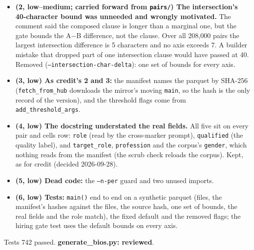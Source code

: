 \documentclass{article}
\begin{document}
\begin{itemize}
        drop. The cost is three times as many real biographies processed and stored.
  \item \textbf{(2, low--medium; carried forward from \texttt{pairs/}) The intersection's 40-character bound was
        unneeded and wrongly motivated.} The comment said the composed clause is longer than a marginal one, but the
        gate bounds the A$-$B difference, not the clause. Over all 208{,}000 pairs the largest intersection
        difference is 5 characters and no axis exceeds 7. A builder mistake that dropped part of one intersection
        clause would have passed at 40. Removed (\texttt{--intersection-char-delta}): one set of bounds for every axis.
  \item \textbf{(3, low) As credit's 2 and 3:} the manifest names the parquet by SHA-256 (\texttt{fetch\_from\_hub}
        downloads the mirror's moving \texttt{main}, so the hash is the only record of the version), and the
        threshold flags come from \texttt{add\_threshold\_args}.
  \item \textbf{(4, low) The docstring understated the real fields.} All five sit on every pair and cells row:
        \texttt{role} (read by the cross-marker prompt), \texttt{qualified} (the quality label), and
        \texttt{target\_role}, \texttt{profession} and the corpus's \texttt{gender}, which nothing reads from the
        manifest (the scrub check reloads the corpus). Kept, as for credit (decided 2026-09-28).
  \item \textbf{(5, low) Dead code:} the \texttt{--n-per} guard and two unused imports.
  \item \textbf{(6, low) Tests:} \texttt{main()} end to end on a synthetic parquet (files, the manifest's hashes
        against the files, the source hash, one set of bounds, the real fields and the role match), the fixed
        default and the removed flags; the hiring gate test uses the default bounds on every axis.
\end{itemize}
Tests 742 passed. \textbf{generate\_bios.py: reviewed}.
\end{document}
